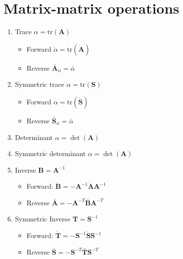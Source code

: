 \documentclass{article}
\begin{document}
    \section{Matrix-matrix operations}\label{sec:matrix-matrix-operations}

    \begin{enumerate}
        \item Trace $\alpha = \text{tr}(\mathbf{A})$
        \begin{itemize}
            \item Forward $\dot{\alpha} = \text{tr}(\dot{\mathbf{A}})$
            \item Reverse $\bar{\mathbf{A}}_{ii} = \bar{\alpha}$
        \end{itemize}

        \item Symmetric trace $\alpha = \text{tr}(\mathbf{S})$
        \begin{itemize}
            \item Forward $\dot{\alpha} = \text{tr}(\dot{\mathbf{S}})$
            \item Reverse $\bar{\mathbf{S}}_{ii} = \bar{\alpha}$
        \end{itemize}

        \item Determinant $\alpha = \det(\mathbf{A})$
        \item Symmetric determinant $\alpha = \det(\mathbf{A})$

        \item Inverse $\mathbf{B} = \mathbf{A}^{-1}$
        \begin{itemize}
            \item Forward: $\dot{\mathbf{B}} = - \mathbf{A}^{-1} \dot{\mathbf{A}} \mathbf{A}^{-1}$
            \item Reverse $\bar{\mathbf{A}} = - \mathbf{A}^{-T} \bar{\mathbf{B}} \mathbf{A}^{-T}$
        \end{itemize}

        \item Symmetric Inverse $\mathbf{T} = \mathbf{S}^{-1}$
        \begin{itemize}
            \item Forward: $\dot{\mathbf{T}} = - \mathbf{S}^{-1} \dot{\mathbf{S}} \mathbf{S}^{-1}$
            \item Reverse $\bar{\mathbf{S}} = - \mathbf{S}^{-T} \bar{\mathbf{T}} \mathbf{S}^{-T}$
        \end{itemize}


\end{enumerate}
\end{document}
